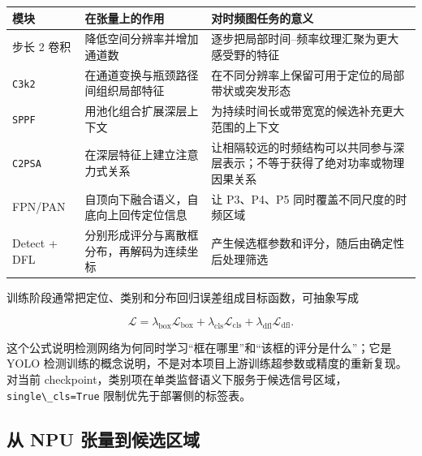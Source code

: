 \begin{longtable}[]{@{}
  >{\raggedright\arraybackslash}p{}
  >{\raggedright\arraybackslash}p{}
  >{\raggedright\arraybackslash}p{}@{}}
\toprule\noalign{}
\begin{minipage}[b]{\linewidth}\raggedright
模块
\end{minipage} & \begin{minipage}[b]{\linewidth}\raggedright
在张量上的作用
\end{minipage} & \begin{minipage}[b]{\linewidth}\raggedright
对时频图任务的意义
\end{minipage} \\
\midrule\noalign{}
\endhead
\bottomrule\noalign{}
\endlastfoot
步长 2 卷积 & 降低空间分辨率并增加通道数 &
逐步把局部时间--频率纹理汇聚为更大感受野的特征 \\
\passthrough{\lstinline!C3k2!} & 在通道变换与瓶颈路径间组织局部特征 &
在不同分辨率上保留可用于定位的局部带状或突发形态 \\
\passthrough{\lstinline!SPPF!} & 用池化组合扩展深层上下文 &
为持续时间长或带宽宽的候选补充更大范围的上下文 \\
\passthrough{\lstinline!C2PSA!} & 在深层特征上建立注意力式关系 &
让相隔较远的时频结构可以共同参与深层表示；不等于获得了绝对功率或物理因果关系 \\
FPN/PAN & 自顶向下融合语义，自底向上回传定位信息 & 让 P3、P4、P5
同时覆盖不同尺度的时频区域 \\
Detect + DFL & 分别形成评分与离散框分布，再解码为连续坐标 &
产生候选框参数和评分，随后由确定性后处理筛选 \\
\end{longtable}

训练阶段通常把定位、类别和分布回归误差组成目标函数，可抽象写成

\[
\mathcal{L}=\lambda_{\mathrm{box}}\mathcal{L}_{\mathrm{box}}
+\lambda_{\mathrm{cls}}\mathcal{L}_{\mathrm{cls}}
+\lambda_{\mathrm{dfl}}\mathcal{L}_{\mathrm{dfl}}.
\]

这个公式说明检测网络为何同时学习``框在哪里''和``该框的评分是什么''；它是
YOLO
检测训练的概念说明，不是对本项目上游训练超参数或精度的重新复现。对当前
checkpoint，类别项在单类监督语义下服务于候选信号区域，\passthrough{\lstinline!single\_cls=True!}
限制优先于部署侧的标签表。

\subsection{从 NPU
张量到候选区域}\label{src-experiment-case5-yolo-decode}

